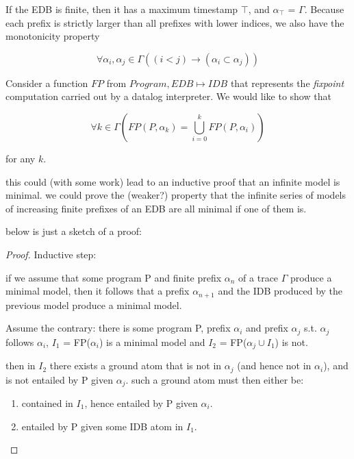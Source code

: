 \begin{itemize}
If the EDB is finite, then it has a maximum timestamp $\top$, and $\alpha_{\top}$ = $\Gamma$.  Because each prefix is strictly larger than
all prefixes with lower indices, we also have the monotonicity property

\begin{equation}
\forall \alpha_{i}, \alpha_{j} \in \Gamma ((i < j) \to (\alpha_{i} \subset \alpha_{j}))
\end{equation}

Consider a function $FP$ from $Program, EDB \mapsto IDB$ that represents the \emph{fixpoint} computation carried out by a datalog interpreter.
We would like to show that 

\begin{equation}
\forall k \in \Gamma (FP(P, \alpha_{k}) =  \displaystyle \bigcup_{i=0}^{k} FP(P, \alpha_{i}))
\end{equation}

for any $k$. 

this could (with some work) lead to an inductive proof
that an infinite model is minimal.  we could prove the (weaker?) property that
the infinite series of models of increasing finite prefixes of an EDB are all 
minimal if one of them is.

below is just a sketch of a proof:

\begin{proof}

Inductive step:

if we assume that some program P and finite prefix $\alpha_n$ of a trace $\Gamma$ produce a minimal model, 
then it follows that a prefix $\alpha_{n+1}$ and the IDB produced by the previous model produce a minimal model.

Assume the contrary: there is some program P, prefix $\alpha_i$ and prefix $\alpha_j$  s.t. $\alpha_j$ follows $\alpha_i$, $I_1$ = FP($\alpha_i$) is a minimal model 
and $I_2$ = FP($\alpha_j \cup I_1$) is not.  

then in $I_2$ there exists a ground atom that is not in $\alpha_j$   (and hence not in $\alpha_i$), and is not entailed by P given $\alpha_j$.  
such a ground atom must then either be:

\begin{enumerate}
\item contained in $I_1$, hence entailed by P given $\alpha_i$.
\item entailed by P given some IDB atom in $I_1$.
\end{enumerate}


\end{proof}
\end{itemize}
